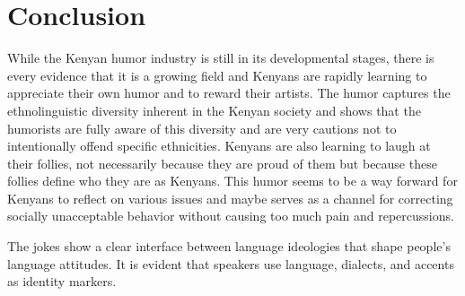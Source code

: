 \documentclass[output=paper]{langsci/langscibook}
\begin{document}
\section{Conclusion}

While the Kenyan humor industry is still in its developmental stages, there is every evidence that it is a growing field and Kenyans are rapidly learning to appreciate their own humor and to reward their artists. The humor captures the ethnolinguistic diversity inherent in the Kenyan society and shows that the humorists are fully aware of this diversity and are very cautions not to intentionally offend specific ethnicities. Kenyans are also learning to laugh at their follies, not necessarily because they are proud of them but because these follies define who they are as Kenyans. This humor seems to be a way forward for Kenyans to reflect on various issues and maybe serves as a channel for correcting socially unacceptable behavior without causing too much pain and repercussions.

The jokes show a clear interface between language ideologies that shape people’s language attitudes. It is evident that speakers use language, dialects, and accents as identity markers. \\


\printbibliography[heading=subbibliography,notkeyword=this]
\end{document}
